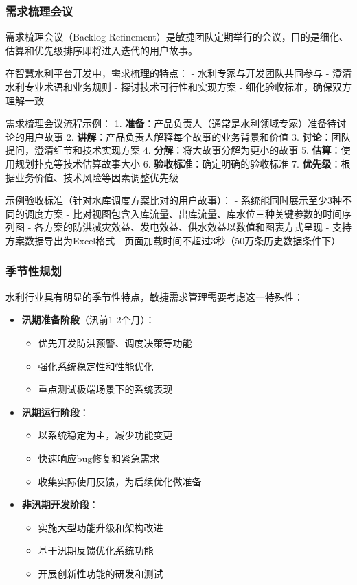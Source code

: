 \subsubsection{需求梳理会议}\label{ux9700ux6c42ux68b3ux7406ux4f1aux8bae}

需求梳理会议（Backlog
Refinement）是敏捷团队定期举行的会议，目的是细化、估算和优先级排序即将进入迭代的用户故事。

在智慧水利平台开发中，需求梳理的特点： - 水利专家与开发团队共同参与 -
澄清水利专业术语和业务规则 - 探讨技术可行性和实现方案 -
细化验收标准，确保双方理解一致

需求梳理会议流程示例： 1.
\textbf{准备}：产品负责人（通常是水利领域专家）准备待讨论的用户故事 2.
\textbf{讲解}：产品负责人解释每个故事的业务背景和价值 3.
\textbf{讨论}：团队提问，澄清细节和技术实现方案 4.
\textbf{分解}：将大故事分解为更小的故事 5.
\textbf{估算}：使用规划扑克等技术估算故事大小 6.
\textbf{验收标准}：确定明确的验收标准 7.
\textbf{优先级}：根据业务价值、技术风险等因素调整优先级

示例验收标准（针对水库调度方案比对的用户故事）： -
系统能同时展示至少3种不同的调度方案 -
比对视图包含入库流量、出库流量、库水位三种关键参数的时间序列图 -
各方案的防洪减灾效益、发电效益、供水效益以数值和图表方式呈现 -
支持方案数据导出为Excel格式 -
页面加载时间不超过3秒（50万条历史数据条件下）

\subsubsection{季节性规划}\label{ux5b63ux8282ux6027ux89c4ux5212}

水利行业具有明显的季节性特点，敏捷需求管理需要考虑这一特殊性：

\begin{itemize}
\tightlist
\item
  \textbf{汛期准备阶段}（汛前1-2个月）：

  \begin{itemize}
  \tightlist
  \item
    优先开发防洪预警、调度决策等功能
  \item
    强化系统稳定性和性能优化
  \item
    重点测试极端场景下的系统表现
  \end{itemize}
\item
  \textbf{汛期运行阶段}：

  \begin{itemize}
  \tightlist
  \item
    以系统稳定为主，减少功能变更
  \item
    快速响应bug修复和紧急需求
  \item
    收集实际使用反馈，为后续优化做准备
  \end{itemize}
\item
  \textbf{非汛期开发阶段}：

  \begin{itemize}
  \tightlist
  \item
    实施大型功能升级和架构改进
  \item
    基于汛期反馈优化系统功能
  \item
    开展创新性功能的研发和测试
  \end{itemize}
\end{itemize}

